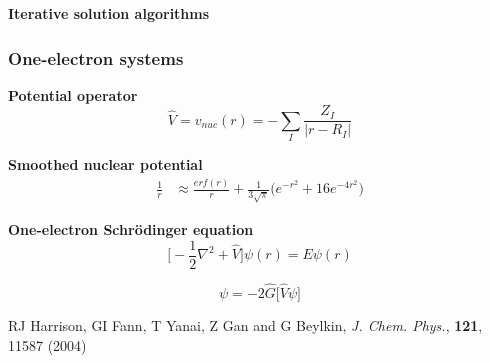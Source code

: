 
\begin{frame}
    \centering
    \textbf{\Large{Iterative solution algorithms}}
\end{frame}

\begin{frame}
    \frametitle{One-electron systems}
    \centering
    \textbf{Potential operator}
    \begin{equation}
	\nonumber
	\hat{V} = v_{nuc}(r) = -\sum_I\frac{Z_I}{|r-R_I|}
    \end{equation}

    \vspace{5mm}

    \textbf{Smoothed nuclear potential}
    \begin{align}
	\nonumber
	\frac{1}{r} &\approx \frac{erf(r)}{r} +
	\frac{1}{3\sqrt{\pi}}\big(e^{-r^2}+16e^{-4r^2}\big)
    \end{align}

    \vspace{5mm}

    \textbf{One-electron Schr\"{o}dinger equation}
    \begin{equation}
        \nonumber
        \Big[-\frac{1}{2}\nabla^2 + \hat{V}\Big]\psi(r) = E \psi(r)
    \end{equation}

    \vspace{1mm}

    \begin{equation}
        \nonumber
        \psi = -2\hat{G} \Big[\hat{V} \psi \Big]
    \end{equation}

    \vspace{5mm}

    \centering
    \tiny
    RJ Harrison, GI Fann, T Yanai, Z Gan and G Beylkin,
    {\it J. Chem. Phys.}, 
    \textbf{121},
    11587 (2004)
\end{frame}

